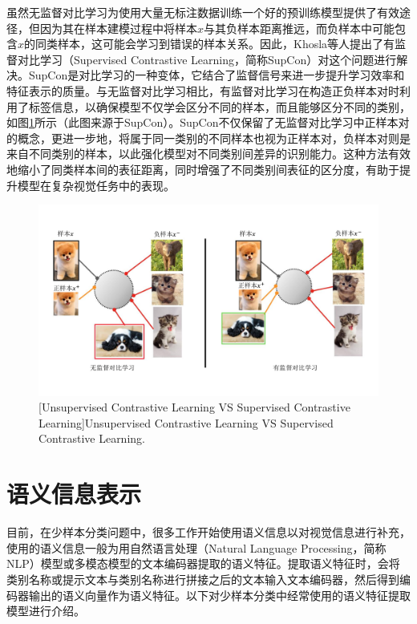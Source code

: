 虽然无监督对比学习为使用大量无标注数据训练一个好的预训练模型提供了有效途径，但因为其在样本建模过程中将样本$x$与其负样本距离推远，而负样本中可能包含$x$的同类样本，这可能会学习到错误的样本关系。因此，Khosla等人\cite{SupCon}提出了有监督对比学习（Supervised Contrastive Learning，简称SupCon）对这个问题进行解决。SupCon是对比学习的一种变体，它结合了监督信号来进一步提升学习效率和特征表示的质量。与无监督对比学习相比，有监督对比学习在构造正负样本对时利用了标签信息，以确保模型不仅学会区分不同的样本，而且能够区分不同的类别，如图\ref{figure2: 对比学习}所示（此图来源于SupCon\cite{SupCon}）。SupCon不仅保留了无监督对比学习中正样本对的概念，更进一步地，将属于同一类别的不同样本也视为正样本对，负样本对则是来自不同类别的样本，以此强化模型对不同类别间差异的识别能力。这种方法有效地缩小了同类样本间的表征距离，同时增强了不同类别间表征的区分度，有助于提升模型在复杂视觉任务中的表现。

\begin{figure}[h!]
  \centering
  \includegraphics[width=1.0\columnwidth]{figures/RelatedWork/对比学习.pdf}
  [Unsupervised Contrastive Learning VS Supervised Contrastive Learning]{Unsupervised Contrastive Learning VS Supervised Contrastive Learning.}
  \label{figure2: 对比学习}
\end{figure}

\section[\hspace{-2pt}语义信息表示]{{\heiti{} \hspace{-8pt}语义信息表示}}\label{section2: 语义信息表示}

目前，在少样本分类问题中，很多工作开始使用语义信息以对视觉信息进行补充，使用的语义信息一般为用自然语言处理（Natural Language Processing，简称NLP）模型或多模态模型的文本编码器提取的语义特征。提取语义特征时，会将类别名称或提示文本与类别名称进行拼接之后的文本输入文本编码器，然后得到编码器输出的语义向量作为语义特征。以下对少样本分类中经常使用的语义特征提取模型进行介绍。

